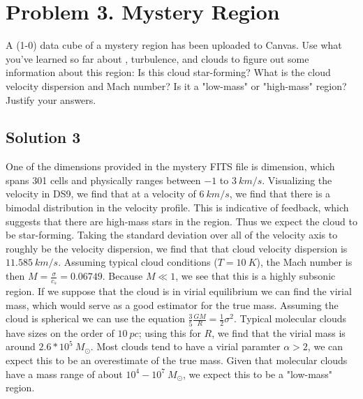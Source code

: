 \documentclass[11pt]{article}
\begin{document}
\newpage
\section*{Problem 3. Mystery Region}
A  (1-0) data cube of a mystery region has been uploaded to Canvas. Use what you've learned so far about , turbulence, and clouds to figure out some information about this region: Is this cloud star-forming? What is the cloud velocity dispersion and Mach number? Is it a "low-mass" or "high-mass" region? Justify your answers.
\subsection*{Solution 3}
One of the dimensions provided in the mystery FITS file is dimension, which spans 301 cells and physically ranges between $-1$ to $3\ \si{km/s}$. Visualizing the velocity in DS9, we find that at a velocity of $6\ \si{km/s}$, we find that there is a bimodal distribution in the velocity profile. This is indicative of feedback, which suggests that there are high-mass stars in the region. Thus we expect the cloud to be star-forming. Taking the standard deviation over all of the velocity axis to roughly be the velocity dispersion, we find that that cloud velocity dispersion is $11.585\ \si{km/s}$. Assuming typical cloud conditions ($T = 10\ \si{K}$), the Mach number is then $M = \frac{\sigma}{c_{s}} = 0.06749$. Because $M \ll 1$, we see that this is a highly subsonic region. If we suppose that the cloud is in virial equilibrium we can find the virial mass, which would serve as a good estimator for the true mass. Assuming the cloud is spherical we can use the equation $\frac{3}{5}\frac{GM}{R} = \frac{1}{2}\sigma^{2}$. Typical molecular clouds have sizes on the order of $10\ \si{pc}$; using this for $R$, we find that the virial mass is around $2.6*10^{5}\ M_{\odot}$. Most clouds tend to have a virial paramter $\alpha > 2$, we can expect this to be an overestimate of the true mass. Given that molecular clouds have a mass range of about $10^{4}-10^{7}\ M_{\odot}$, we expect this to be a "low-mass" region. 
\end{document}
